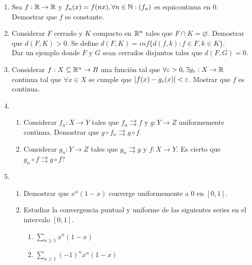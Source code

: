 \begin{enumerate}
  \item Sea $f : \mathbb{R} \to \mathbb{R}$ y $f_n(x) = f(nx), \forall n \in \mathbb{N} : (f_n)$ es equicontinua en $0$. Demostrar que $f$ es constante.
  \item Considerar $F$ cerrado y $K$ compacto en $\mathbb{R}^n$ tales que $F \cap K = \varnothing$. Demostrar que $d(F, K) > 0$. Se define $d(F, K) = inf\{ d(f, k) : f \in F, k \in K \}$. \\ Dar un ejemplo donde $F$ y $G$ sean cerrados disjuntos tales que $d(F, G) = 0$.
  \item Considerar $f: X \subseteq \mathbb{R}^n \to R$ una función tal que $\forall \varepsilon > 0, \exists g_{\varepsilon}: X \to \mathbb{R}$ continua tal que $\forall x \in X$ se cumple que $|f(x) - g_{\varepsilon}(x)| < \varepsilon$. Mostrar que $f$ es continua.
  \item \begin{enumerate}
    \item Considerar $f_n: X \to Y$ tales que $f_n \rightrightarrows f$ y $g: Y \to Z$ uniformemente continua. Demostrar que $g \circ f_n \rightrightarrows g \circ f$.
    \item Considerar $g_n : Y \to Z$ tales que $g_n \rightrightarrows g$ y $f: X \to Y$. Es cierto que $g_n \circ f \rightrightarrows g \circ f$?
  \end{enumerate}
  \item \begin{enumerate}
    \item Demostrar que $x^n(1-x)$ converge uniformemente a $0$ en $[0, 1]$.
    \item Estudiar la convergencia puntual y uniforme de las siguientes series en el intervalo $[0, 1]$. \begin{enumerate} \item $\sum_{n \geq 1} x^n(1-x)$ \item $\sum_{n \geq 1} (-1)^n x^n(1-x) $ \end{enumerate}
  \end{enumerate}
\end{enumerate}
